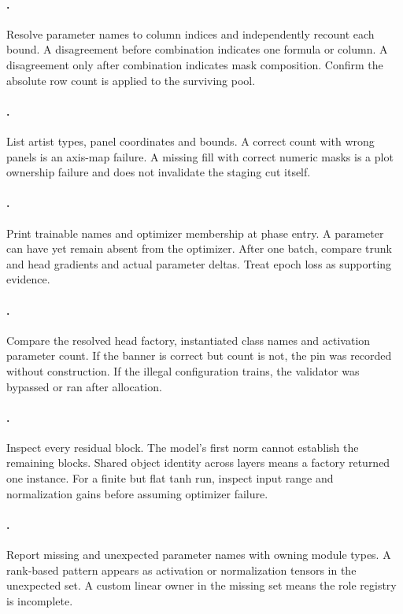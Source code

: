 \paragraph{.}
Resolve parameter names to column indices and independently recount each
bound.  A disagreement before combination indicates one formula or column.
A disagreement only after combination indicates mask composition.  Confirm
the absolute row count is applied to the surviving pool.

\paragraph{.}
List artist types, panel coordinates and bounds.  A correct count with wrong
panels is an axis-map failure.  A missing fill with correct numeric masks is a
plot ownership failure and does not invalidate the staging cut itself.

\paragraph{.}
Print trainable names and optimizer membership at phase entry.  A parameter
can have  yet remain absent from the optimizer.
After one batch, compare trunk and head gradients and actual parameter deltas.
Treat epoch loss as supporting evidence.

\paragraph{.}
Compare the resolved head factory, instantiated class names and activation
parameter count.  If the banner is correct but count is not, the pin was
recorded without construction.  If the illegal configuration trains, the
validator was bypassed or ran after allocation.

\paragraph{.}
Inspect every residual block.  The model's first norm cannot establish the
remaining blocks.  Shared object identity across layers means a factory
returned one instance.  For a
finite but flat tanh run, inspect input range and normalization gains before
assuming optimizer failure.

\paragraph{.}
Report missing and unexpected parameter names with owning module types.  A
rank-based pattern appears as activation or normalization tensors in the
unexpected set.  A custom linear owner in the missing set means the role
registry is incomplete.

